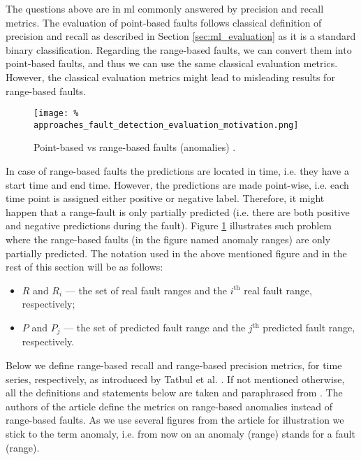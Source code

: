 The questions above are in \gls{ml} commonly answered by precision and recall metrics.
The evaluation of point-based faults follows classical definition of precision and recall as described in Section \ref{sec:ml_evaluation} as it is a standard binary classification.
Regarding the range-based faults, we can convert them into point-based faults, and thus we can use the same classical evaluation metrics.
However, the classical evaluation metrics might lead to misleading results for range-based faults.

\begin{figure}
    \texttt{[image: \%
        approaches\_fault\_detection\_evaluation\_motivation.png]}
    \caption{Point-based vs range-based faults (anomalies) \cite{tatbul2018precision}.}
    \label{fig:approaches_fault_detection_evaluation_motivation}
    \centering
\end{figure}

In case of range-based faults the predictions are located in time, i.e. they have a start time and end time.
However, the predictions are made point-wise, i.e. each time point is assigned either positive or negative label.
Therefore, it might happen that a range-fault is only partially predicted (i.e. there are both positive and negative predictions during the fault).
Figure \ref{fig:approaches_fault_detection_evaluation_motivation} illustrates such problem where the range-based faults (in the figure named anomaly ranges) are only partially predicted.
The notation used in the above mentioned figure and in the rest of this section will be as follows:
\begin{itemize}
    \item $R$ and $R_i$ --- the set of real fault ranges and the $i^\text{th}$ real fault range, respectively;
    \item $P$ and $P_j$ --- the set of predicted fault range and the $j^\text{th}$ predicted fault range, respectively.
\end{itemize}
Below we define range-based recall and range-based precision metrics, for time series, respectively, as introduced by Tatbul et al. \cite{tatbul2018precision}.
If not mentioned otherwise, all the definitions and statements below are taken and paraphrased from \cite{tatbul2018precision}.
The authors of the article define the metrics on range-based anomalies instead of range-based faults.
As we use several figures from the article for illustration we stick to the term anomaly, i.e. from now on an anomaly (range) stands for a fault (range).

